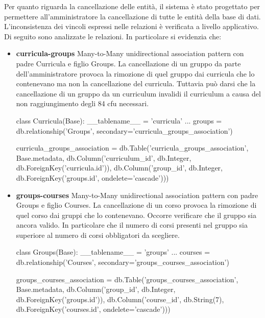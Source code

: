 \documentclass{article}
\begin{document}
Per quanto riguarda la cancellazione delle entità, il sistema è stato progettato per permettere all'amministratore la cancellazione di tutte le entità della base di dati. L'inconsistenza dei vincoli espressi nelle relazioni è verificata a livello applicativo.\\ Di seguito sono analizzate le relazioni.
In particolare si evidenzia che: \\
\begin{itemize}
\item \textbf{curricula-groups}  Many-to-Many unidirectional association pattern con padre Curricula e figlio Groups.
La cancellazione di un gruppo da parte dell'amministratore provoca la rimozione di quel gruppo dai curricula che lo contenevano ma non la cancellazione del curricula. Tuttavia può darsi che la cancellazione di un gruppo da un curriculum invalidi il curriculum a causa del non raggiungimento degli 84 cfu necessari.
\begin{python}
class Curricula(Base):
    __tablename__ = 'curricula'
	...
    groups = db.relationship('Groups', secondary='curricula_groups_association')
    
curricula_groups_association = db.Table('curricula_groups_association', Base.metadata,
    db.Column('curriculum_id', db.Integer, db.ForeignKey('curricula.id')),
    db.Column('group_id',  db.Integer, db.ForeignKey('groups.id',  ondelete='cascade')))
\end{python}

\item \textbf{groups-courses} Many-to-Many unidirectional association pattern con padre Groups e figlio Courses.
La cancellazione di un corso provoca la rimozione di quel corso dai gruppi che lo contenevano. Occorre verificare che il gruppo sia ancora valido. In particolare che il numero di corsi presenti nel gruppo sia superiore al numero di corsi obbligatori da scegliere.
\begin{python}
class Groups(Base):
    __tablename__ = 'groups'
	...
    courses = db.relationship('Courses', secondary='groups_courses_association')

groups_courses_association = db.Table('groups_courses_association', Base.metadata,
    db.Column('group_id', db.Integer, db.ForeignKey('groups.id')),
    db.Column('course_id', db.String(7), db.ForeignKey('courses.id',  ondelete='cascade')))
\end{python}


\end{itemize}
\end{document}
